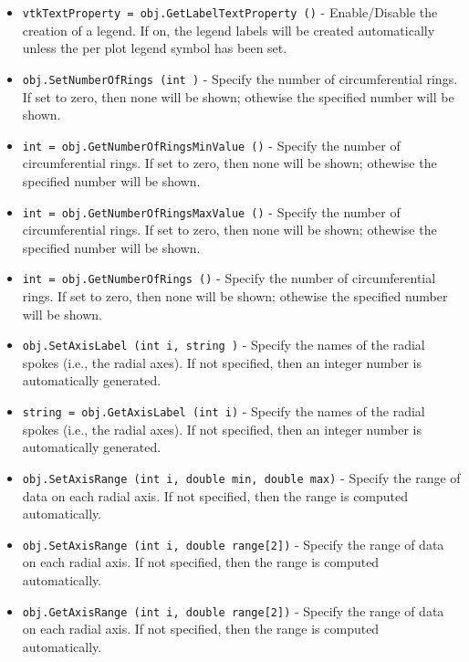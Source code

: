 \begin{itemize}
\item  \verb|vtkTextProperty = obj.GetLabelTextProperty ()| -  Enable/Disable the creation of a legend. If on, the legend labels will
 be created automatically unless the per plot legend symbol has been
 set.

\item  \verb|obj.SetNumberOfRings (int )| -  Specify the number of circumferential rings. If set to zero, then
 none will be shown; othewise the specified number will be shown.

\item  \verb|int = obj.GetNumberOfRingsMinValue ()| -  Specify the number of circumferential rings. If set to zero, then
 none will be shown; othewise the specified number will be shown.

\item  \verb|int = obj.GetNumberOfRingsMaxValue ()| -  Specify the number of circumferential rings. If set to zero, then
 none will be shown; othewise the specified number will be shown.

\item  \verb|int = obj.GetNumberOfRings ()| -  Specify the number of circumferential rings. If set to zero, then
 none will be shown; othewise the specified number will be shown.

\item  \verb|obj.SetAxisLabel (int i, string )| -  Specify the names of the radial spokes (i.e., the radial axes). If
 not specified, then an integer number is automatically generated.

\item  \verb|string = obj.GetAxisLabel (int i)| -  Specify the names of the radial spokes (i.e., the radial axes). If
 not specified, then an integer number is automatically generated.

\item  \verb|obj.SetAxisRange (int i, double min, double max)| -  Specify the range of data on each radial axis. If not specified,
 then the range is computed automatically. 

\item  \verb|obj.SetAxisRange (int i, double range[2])| -  Specify the range of data on each radial axis. If not specified,
 then the range is computed automatically. 

\item  \verb|obj.GetAxisRange (int i, double range[2])| -  Specify the range of data on each radial axis. If not specified,
 then the range is computed automatically. 


\end{itemize}

